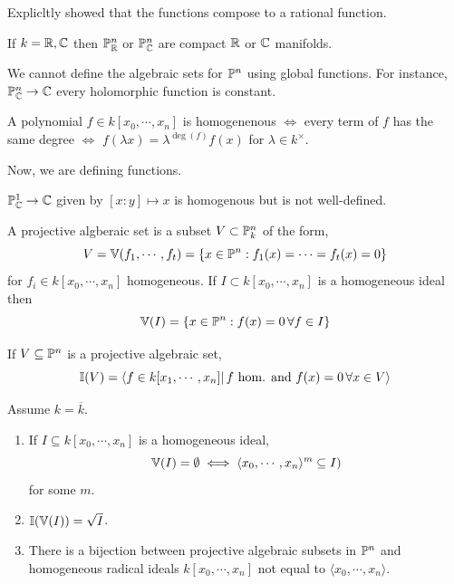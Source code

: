 \documentclass[12pt]{article}
\begin{document}
\begin{example}
    Explicltly showed that the functions compose to a rational function. 
\end{example}

\begin{theorem}[Fact.]
    If $k = \R, \C$ then $\P^n_\R$ or $\P^n_\C$ are compact $\R$ or $\C$ manifolds. 
\end{theorem}

We cannot define the algebraic sets for $\P^n$ using global functions. For instance, $\P^n_\C \to \C$ every holomorphic function is constant. 

\begin{definition}
    A polynomial $f \in k[x_0, \cdots, x_n]$ is homogenenous $\iff$ every term of $f$ has the same degree $\iff$ $f(\lambda x) = \lambda^{\deg(f)}f(x)$ for $\lambda \in k^\times$. 
\end{definition}

Now, we are defining functions. 
\begin{example}
    $\P^1_\C \to \C$ given by $[x: y] \mapsto x$ is homogenous but is not well-defined. 
\end{example}

\begin{definition}
    A projective algberaic set is a subset $V \subset \P^n_k$ of the form, 
    \[ V = \V(f_1, \cdots, f_t) = \{ x \in \P^n : f_1(x) = \cdots = f_t(x) = 0 \}\]
    for $f_i \in k[x_0, \cdots, x_n]$ homogeneous.  
    If $I \subset k[x_0, \cdots, x_n]$ is a homogeneous ideal then
    \[ \V(I) = \{ x \in \P^n : f(x) = 0 \, \forall f \in I\}\]
\end{definition}

\begin{definition}
    If $V \subseteq \P^n$ is a projective algebraic set, 
    \[ \I(V) = \langle f \in k[x_1, \cdots, x_n] | \, f \text{ hom. and } f(x) = 0 \, \forall x \in V\rangle \]
\end{definition}

\begin{theorem}
    Assume $k = \overline{k}$. 
    \begin{enumerate}
        \item If $I \subseteq k[x_0, \cdots, x_n]$ is a homogeneous ideal,
        \[ \V(I) = \emptyset \iff \langle x_0, \cdots, x_n \rangle^m \subseteq I)\]
        for some $m$.  
        \item $\I(\V(I)) = \sqrt{I}$. 
        \item There is a bijection between projective algebraic subsets in $\P^n$ and homogeneous radical ideals $k[x_0, \cdots, x_n]$ not equal to $\langle x_0, \cdots, x_n \rangle$. 
    \end{enumerate}
\end{theorem}
\end{document}
